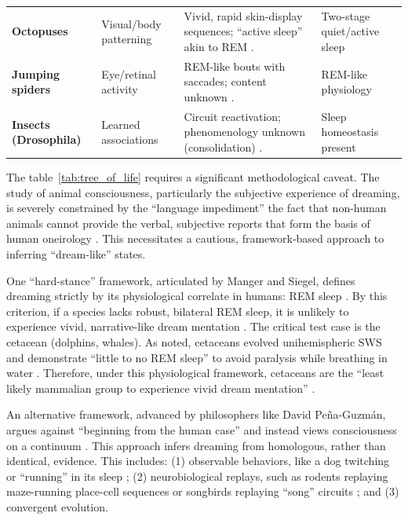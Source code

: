 \begin{table}[h!]
\begin{tabularx}{\textwidth}{@{}>{\raggedright\arraybackslash}p{} L L >{\raggedright\arraybackslash}p{0.20\textwidth}@{}}
\addlinespace
\textbf{Octopuses} & Visual/body patterning & Vivid, rapid skin-display sequences; “active sleep” akin to REM \citep{medeiros2023octopus, ramirezplascencia2023nature, medeiros2021iscience}. & Two-stage quiet/active sleep \\
\addlinespace
\textbf{Jumping spiders} & Eye/retinal activity & REM-like bouts with saccades; content unknown \citep{roessler2022pnas}. & REM-like physiology \\
\addlinespace
\textbf{Insects (Drosophila)} & Learned associations & Circuit reactivation; phenomenology unknown (consolidation) \citep{li2009science, vanalphen2023}. & Sleep homeostasis present \\
\bottomrule
\end{tabularx}
\end{table}


The table~\ref{tab:tree_of_life} requires a significant methodological caveat. The study of animal consciousness, particularly the subjective experience of dreaming, is severely constrained by the ``language impediment'' \- the fact that non-human animals cannot provide the verbal, subjective reports that form the basis of human oneirology \citep{nielsen2003typical}. This necessitates a cautious, framework-based approach to inferring ``dream-like'' states.

One ``hard-stance'' framework, articulated by Manger and Siegel, defines dreaming strictly by its physiological correlate in humans: REM sleep \citep{manger2020}. By this criterion, if a species lacks robust, bilateral REM sleep, it is unlikely to experience vivid, narrative-like dream mentation \citep{manger2020}. The critical test case is the cetacean (dolphins, whales). As noted, cetaceans evolved unihemispheric SWS and demonstrate ``little to no REM sleep'' to avoid paralysis while breathing in water \citep{lyamin2021cetacean}. Therefore, under this physiological framework, cetaceans are the ``least likely mammalian group to experience vivid dream mentation'' \citep{manger2020}.

An alternative framework, advanced by philosophers like David Peña-Guzmán, argues against ``beginning from the human case'' and instead views consciousness on a continuum \citep{penaguzman2022, penaguzman2022_review}. This approach infers dreaming from homologous, rather than identical, evidence. This includes: (1) observable behaviors, like a dog twitching or ``running'' in its sleep \citep{penaguzman2022}; (2) neurobiological replays, such as rodents replaying maze-running place-cell sequences or songbirds replaying ``song'' circuits \citep{lee2024}; and (3) convergent evolution.


